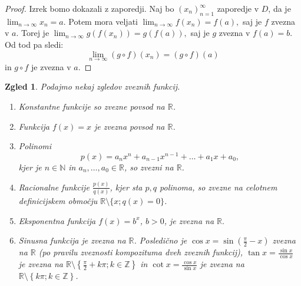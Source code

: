 \documentclass[10pt, a4paper]{article}
\newtheorem{zgled}{Zgled}[section]
\newenvironment{noticeC}{%
  \tcolorbox[%
  notitle,
  empty,
  enhanced,  %
  breakable,
  coltext=black, 
  fontupper=\rmfamily,
  parbox=false,
  noparskip,
  sharp corners,
  boxrule=-1pt,  %
  frame hidden,
  left=7pt,  %
  right=7pt,
  top=5pt,
  bottom=5pt,
  before skip=2.5ex plus 2pt,
  after skip=2.5ex plus 2pt,
  overlay unbroken and last={%
  },
  ]}
{\endtcolorbox}
\newenvironment{dokaz}%
  {\begin{noticeC}\begin{proof}}%
  {\end{proof}\end{noticeC}}
\newcommand{\N}{\mathbb {N}}
\newcommand{\Z}{\mathbb {Z}}
\newcommand{\R}{\mathbb {R}}
\newcommand{\zap}[1]{(#1_n)_{n=1} ^{\infty}}
\newcommand{\limzap}[1]{\lim_{n \to \infty} {#1}}
\begin{document}
    \begin{dokaz}
        Izrek bomo dokazali z zaporedji.
        Naj bo $\zap{x}$ zaporedje v $D$, da je 
        $\limzap{x_n} = a.$ Potem mora veljati
        $\limzap{f(x_n)} = f(a),$ saj je $f$ zvezna v $a$. Torej je
        $\limzap{g(f(x_n))} = g(f(a)),$ saj je $g$ zvezna v $f(a) = b.$ Od tod pa sledi:
        $$\limzap{(g \circ f)(x_n)} = (g \circ f)(a)$$ in $g \circ f$ je zvezna v $a$.
    \end{dokaz}

\begin{zgled}
    Podajmo nekaj zgledov zveznih funkcij.

    \begin{enumerate}
        \item Konstantne funkcije so zvezne povsod na $\R$.
        \item Funkcija $f(x) = x$ je zvezna povsod na $\R$.
        \item Polinomi $$p(x) = a_n x^n + a_{n-1} x^{n-1} + \dots + a_1 x + a_0,$$ kjer je $n \in \N$ in $a_n,\dots,a_0 \in \R$, so zvezni na $\R$.
        \item Racionalne funkcije $\frac{p(x)}{q(x)}$, kjer sta $p,q$ polinoma, so zvezne na celotnem definicijskem območju $\R \setminus\{x; q(x) =0\}$.
        \item Eksponentna funkcija $f(x) = b^x$, $b >0$, je zvezna na $\R.$
        \item Sinusna funkcija je zvezna na $\R$.
        Posledično je $\cos x = \sin{\left( \frac{\pi}{2}-x \right)}$ zvezna na $\R$ (po pravilu zveznosti kompozituma dveh zveznih funkcij),
        $\tan x = \frac{\sin x}{\cos x}$ je zvezna na $\R \setminus \left\lbrace \frac{\pi}{2} + k\pi; k \in \Z \right\rbrace$ in $\cot x = \frac{\cos x}{\sin x}$ je zvezna na $\R \setminus \left\lbrace k\pi; k \in \Z \right\rbrace$.
    \end{enumerate}
\end{zgled}
\end{document}
